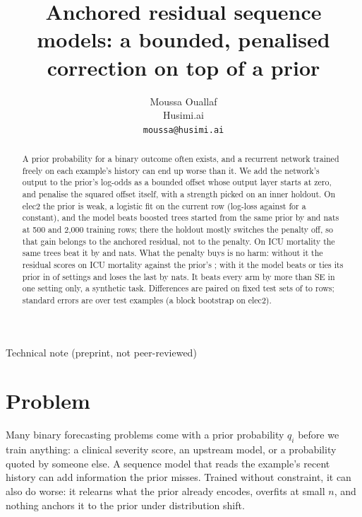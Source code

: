 \documentclass{article}
\title{Anchored residual sequence models: a bounded, penalised correction on top of a prior}
\author{%
  Moussa Ouallaf \\
  Husimi.ai \\
  \texttt{moussa@husimi.ai} \\
}
\begin{document}
\maketitle

\vspace{-1.6em}
\begin{center}
{\small Technical note (preprint, not peer-reviewed)}
\end{center}
\vspace{0.2em}

\begin{abstract}
A prior probability for a binary outcome often exists, and a recurrent network trained freely on each example's
history can end up worse than it. We add the network's output to the prior's log-odds as a bounded offset whose
output layer starts at zero, and penalise the squared offset itself, with a strength picked on an inner holdout. On
elec2 the prior is weak, a logistic fit on the current row (log-loss \nElecMMPriorLL{} against \nElecConstLL{} for
a constant), and the model beats boosted trees started from the same prior by \nElecDDabsGbm{} and
\nElecMMDabsGbm{} nats at 500 and 2,000 training rows; there the holdout mostly switches the penalty off, so that gain belongs to the anchored
residual, not to the penalty. On ICU mortality the same trees beat it by \nPhysDDabsGbm{} and \nPhysMMDabsGbm{}
nats. What the penalty buys is no harm: without it the residual scores \nPhysDLzeroLL{} on ICU mortality against
the prior's \nPhysDPriorLL; with it the model beats or ties its prior in \nPriorNoLoss{} of \nPriorSettings{} settings
and loses the last by \nPhysStrongDDabsfourPrior{} nats. It beats every arm by more than \nKeepSE{} SE in one
setting only, a synthetic task. Differences are paired on fixed test sets of \nPhysMMNtest{} to \nElecMMNtest{}
rows; standard errors are over test examples (a block bootstrap on elec2).
\end{abstract}

\section{Problem}
\label{sec:problem}

Many binary forecasting problems come with a prior probability $q_i$ before we train anything: a clinical severity
score, an upstream model, or a probability quoted by someone else. A sequence model that reads the example's recent
history can add information the prior misses. Trained without constraint, it can also do worse: it relearns what
the prior already encodes, overfits at small $n$, and nothing anchors it to the prior under distribution shift.
\end{document}
